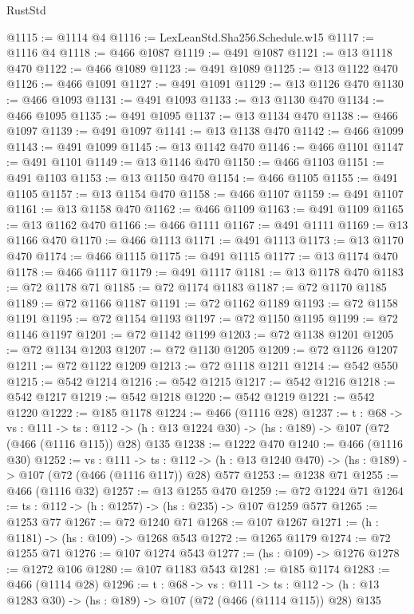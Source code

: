 \begin{lexlean}{RustStd}
\begin{coremodule}
@1115 := @1114 @4
@1116 := LexLeanStd.Sha256.Schedule.w15
@1117 := @1116 @4
@1118 := @466 @1087
@1119 := @491 @1087
@1121 := @13 @1118 @470
@1122 := @466 @1089
@1123 := @491 @1089
@1125 := @13 @1122 @470
@1126 := @466 @1091
@1127 := @491 @1091
@1129 := @13 @1126 @470
@1130 := @466 @1093
@1131 := @491 @1093
@1133 := @13 @1130 @470
@1134 := @466 @1095
@1135 := @491 @1095
@1137 := @13 @1134 @470
@1138 := @466 @1097
@1139 := @491 @1097
@1141 := @13 @1138 @470
@1142 := @466 @1099
@1143 := @491 @1099
@1145 := @13 @1142 @470
@1146 := @466 @1101
@1147 := @491 @1101
@1149 := @13 @1146 @470
@1150 := @466 @1103
@1151 := @491 @1103
@1153 := @13 @1150 @470
@1154 := @466 @1105
@1155 := @491 @1105
@1157 := @13 @1154 @470
@1158 := @466 @1107
@1159 := @491 @1107
@1161 := @13 @1158 @470
@1162 := @466 @1109
@1163 := @491 @1109
@1165 := @13 @1162 @470
@1166 := @466 @1111
@1167 := @491 @1111
@1169 := @13 @1166 @470
@1170 := @466 @1113
@1171 := @491 @1113
@1173 := @13 @1170 @470
@1174 := @466 @1115
@1175 := @491 @1115
@1177 := @13 @1174 @470
@1178 := @466 @1117
@1179 := @491 @1117
@1181 := @13 @1178 @470
@1183 := @72 @1178 @71
@1185 := @72 @1174 @1183
@1187 := @72 @1170 @1185
@1189 := @72 @1166 @1187
@1191 := @72 @1162 @1189
@1193 := @72 @1158 @1191
@1195 := @72 @1154 @1193
@1197 := @72 @1150 @1195
@1199 := @72 @1146 @1197
@1201 := @72 @1142 @1199
@1203 := @72 @1138 @1201
@1205 := @72 @1134 @1203
@1207 := @72 @1130 @1205
@1209 := @72 @1126 @1207
@1211 := @72 @1122 @1209
@1213 := @72 @1118 @1211
@1214 := @542 @550
@1215 := @542 @1214
@1216 := @542 @1215
@1217 := @542 @1216
@1218 := @542 @1217
@1219 := @542 @1218
@1220 := @542 @1219
@1221 := @542 @1220
@1222 := @185 @1178
@1224 := @466 (@1116 @28)
@1237 := {t : @68} ->
  {vs : @111} ->
  {ts : @112} -> (h : @13 @1224 @30) -> (hs : @189) -> @107 (@72 (@466 (@1116 @115)) @28) @135
@1238 := @1222 @470
@1240 := @466 (@1116 @30)
@1252 := {vs : @111} ->
  {ts : @112} -> (h : @13 @1240 @470) -> (hs : @189) -> @107 (@72 (@466 (@1116 @117)) @28) @577
@1253 := @1238 @71
@1255 := @466 (@1116 @32)
@1257 := @13 @1255 @470
@1259 := @72 @1224 @71
@1264 := {ts : @112} -> (h : @1257) -> (hs : @235) -> @107 @1259 @577
@1265 := @1253 @77
@1267 := @72 @1240 @71
@1268 := @107 @1267
@1271 := (h : @1181) -> (hs : @109) -> @1268 @543
@1272 := @1265 @1179
@1274 := @72 @1255 @71
@1276 := @107 @1274 @543
@1277 := (hs : @109) -> @1276
@1278 := @1272 @106
@1280 := @107 @1183 @543
@1281 := @185 @1174
@1283 := @466 (@1114 @28)
@1296 := {t : @68} ->
  {vs : @111} ->
  {ts : @112} -> (h : @13 @1283 @30) -> (hs : @189) -> @107 (@72 (@466 (@1114 @115)) @28) @135

\end{coremodule}
\end{lexlean}
